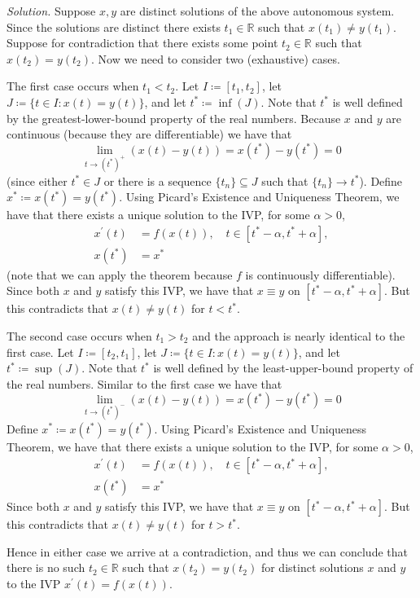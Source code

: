 \documentclass{article}
\newcommand{\R}{\mathbb{R}}
\begin{document}
\textit{Solution.}
Suppose $x, y$ are distinct solutions of the above autonomous system.
Since the solutions are distinct there exists $t_1 \in \R$ such that $x(t_1) \neq y(t_1)$.
Suppose for contradiction that there exists some point $t_2 \in \R$ such that $x(t_2) = y(t_2)$.
Now we need to consider two (exhaustive) cases.

The first case occurs when $t_1 < t_2$. Let $I \coloneqq [t_1, t_2]$, let
$J \coloneqq \{t \in I: x(t) = y(t)\}$, and let $t^* \coloneqq \inf(J)$.
Note that $t^*$ is well defined by the greatest-lower-bound property of the real numbers.
Because $x$ and $y$ are continuous (because they are differentiable) we have that
%
\begin{equation*}
    \lim_{t \to (t^*)^+} (x(t) - y(t)) = x(t^*) - y(t^*) = 0
\end{equation*}
%
(since either $t^* \in J$ or there is a sequence $\{t_n\} \subseteq J$ such that $\{t_n\} \to t^*$).
Define $x^* \coloneqq x(t^*) = y(t^*)$. Using Picard's Existence and Uniqueness Theorem, we have
that there exists a unique solution to the IVP, for some $\alpha > 0$,
%
\begin{align*}
    x^\prime(t) &= f(x(t)), \quad t \in [t^* - \alpha, t^* + \alpha], \\
    x(t^*) &= x^*
\end{align*}
%
(note that we can apply the theorem because $f$ is continuously differentiable). Since both
$x$ and $y$ satisfy this IVP, we have that $x \equiv y$ on $[t^* - \alpha, t^* + \alpha]$.
But this contradicts that $x(t) \neq y(t)$ for $t < t^*$.

The second case occurs when $t_1 > t_2$ and the approach is nearly identical to the first case.
Let $I \coloneqq [t_2, t_1]$, let $J \coloneqq \{t \in I: x(t) = y(t)\}$, and let $t^* \coloneqq \sup(J)$.
Note that $t^*$ is well defined by the least-upper-bound property of the real numbers.
Similar to the first case we have that
%
\begin{equation*}
    \lim_{t \to (t^*)^-} (x(t) - y(t)) = x(t^*) - y(t^*) = 0
\end{equation*}
%
Define $x^* \coloneqq x(t^*) = y(t^*)$. Using Picard's Existence and Uniqueness Theorem, we have
that there exists a unique solution to the IVP, for some $\alpha > 0$,
%
\begin{align*}
    x^\prime(t) &= f(x(t)), \quad t \in [t^* - \alpha, t^* + \alpha], \\
    x(t^*) &= x^*
\end{align*}
%
Since both $x$ and $y$ satisfy this IVP, we have that $x \equiv y$ on $[t^* - \alpha, t^* + \alpha]$.
But this contradicts that $x(t) \neq y(t)$ for $t > t^*$.

Hence in either case we arrive at a contradiction, and thus we can conclude that there
is no such $t_2 \in \R$ such that $x(t_2) = y(t_2)$ for distinct solutions
$x$ and $y$ to the IVP $x^\prime(t) = f(x(t))$.
\end{document}
